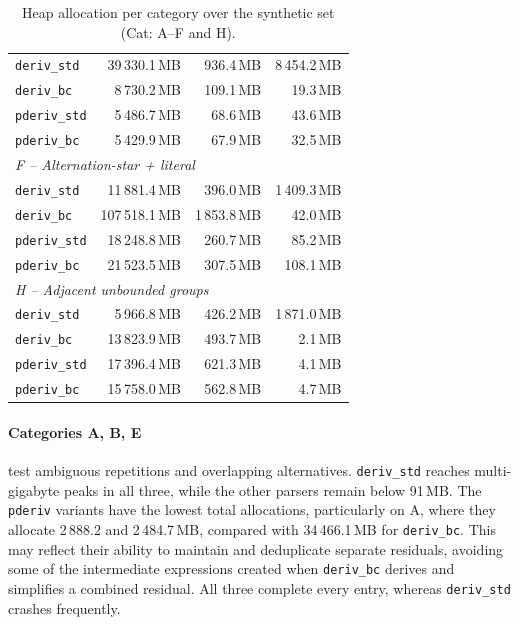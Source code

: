 \begin{table}[H]
\begin{tabular*}{\textwidth}{@{\extracolsep{\fill}} l rrr}
\texttt{deriv\_std}  & 39\,330.1\,MB &   936.4\,MB & 8\,454.2\,MB \\
\texttt{deriv\_bc}   &  8\,730.2\,MB &   109.1\,MB &    19.3\,MB \\
\texttt{pderiv\_std} &  5\,486.7\,MB &    68.6\,MB &    43.6\,MB \\
\texttt{pderiv\_bc}  &  5\,429.9\,MB &    67.9\,MB &    32.5\,MB \\
\hline
\multicolumn{4}{l}{\textit{F -- Alternation-star + literal}} \\
\texttt{deriv\_std}  & 11\,881.4\,MB &   396.0\,MB & 1\,409.3\,MB \\
\texttt{deriv\_bc}   & 107\,518.1\,MB & 1\,853.8\,MB &    42.0\,MB \\
\texttt{pderiv\_std} & 18\,248.8\,MB &   260.7\,MB &    85.2\,MB \\
\texttt{pderiv\_bc}  & 21\,523.5\,MB &   307.5\,MB &   108.1\,MB \\
\hline
\multicolumn{4}{l}{\textit{H -- Adjacent unbounded groups}} \\
\texttt{deriv\_std}  &  5\,966.8\,MB &   426.2\,MB & 1\,871.0\,MB \\
\texttt{deriv\_bc}   & 13\,823.9\,MB &   493.7\,MB &     2.1\,MB \\
\texttt{pderiv\_std} & 17\,396.4\,MB &   621.3\,MB &     4.1\,MB \\
\texttt{pderiv\_bc}  & 15\,758.0\,MB &   562.8\,MB &     4.7\,MB \\
\hline
\end{tabular*}
\caption{Heap allocation per category over the synthetic set
(Cat: A--F and H).}
\label{tab:patho-memory-full-af}
\end{table}

%
%
%


\paragraph{Categories A, B, E}
test ambiguous repetitions and overlapping
alternatives.
\texttt{deriv\_std} reaches multi-gigabyte
peaks in all three, while the other parsers
remain below 91\,MB.
The \texttt{pderiv} variants have the lowest
total allocations, particularly on A,
where they allocate 2\,888.2 and 2\,484.7\,MB,
compared with 34\,466.1\,MB for
\texttt{deriv\_bc}.
This may reflect their ability to maintain
and deduplicate separate residuals, avoiding
some of the intermediate expressions created
when \texttt{deriv\_bc} derives and simplifies
a combined residual.
All three complete every entry, whereas
\texttt{deriv\_std} crashes frequently.


